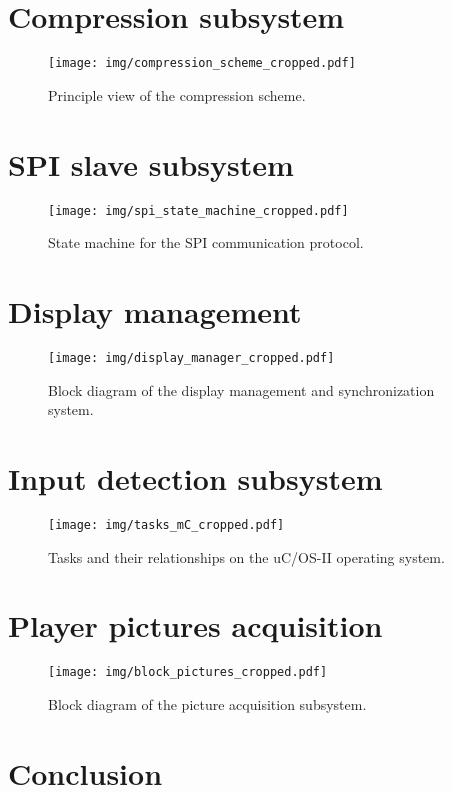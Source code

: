 \documentclass[english, DIV=13]{scrreprt}
\begin{document}
\chapter{Compression subsystem}

\begin{figure}
    \centering
    \texttt{[image: img/compression\_scheme\_cropped.pdf]}
    \caption{Principle view of the compression scheme.}
\end{figure}

\chapter{SPI slave subsystem}

\begin{figure}
    \centering
    \texttt{[image: img/spi\_state\_machine\_cropped.pdf]}
    \caption{State machine for the SPI communication protocol.}
\end{figure}

\chapter{Display management}

\begin{figure}
    \centering
    \texttt{[image: img/display\_manager\_cropped.pdf]}
    \caption{Block diagram of the display management and synchronization system.}
\end{figure}

\chapter{Input detection subsystem}

\begin{figure}
    \centering
    \texttt{[image: img/tasks\_mC\_cropped.pdf]}
    \caption{Tasks and their relationships on the uC/OS-II operating system.}
\end{figure}

\chapter{Player pictures acquisition}

\begin{figure}
    \centering
    \texttt{[image: img/block\_pictures\_cropped.pdf]}
    \caption{Block diagram of the picture acquisition subsystem.}
\end{figure}

\chapter{Conclusion}
\end{document}
